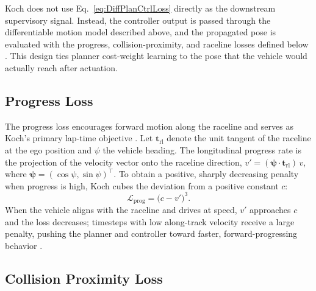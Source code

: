 Koch does not use Eq.~\eqref{eq:DiffPlanCtrlLoss} directly as the downstream supervisory signal.
Instead, the controller output is passed through the differentiable motion model described above, and the propagated pose is evaluated with the progress, collision-proximity, and raceline losses defined below \cite{koch_DifferentiableInterpretablePath_2025}.
This design ties planner cost-weight learning to the pose that the vehicle would actually reach after actuation.

\subsection{Progress Loss}

The progress loss encourages forward motion along the raceline and serves as Koch's primary lap-time objective \cite{koch_DifferentiableInterpretablePath_2025}.
Let $\mathbf{t}_{\text{rl}}$ denote the unit tangent of the raceline at the ego position and $\psi$ the vehicle heading.
The longitudinal progress rate is the projection of the velocity vector onto the raceline direction, $v' = (\boldsymbol{\psi} \cdot \mathbf{t}_{\text{rl}})\, v$, where $\boldsymbol{\psi} = (\cos\psi, \sin\psi)^{\top}$.
To obtain a positive, sharply decreasing penalty when progress is high, Koch cubes the deviation from a positive constant $c$:
\begin{equation}
    \mathcal{L}_{\text{prog}} = \bigl(c - v'\bigr)^{3}.
    \label{eq:DiffPlanProgLoss}
\end{equation}
When the vehicle aligns with the raceline and drives at speed, $v'$ approaches $c$ and the loss decreases; timesteps with low along-track velocity receive a large penalty, pushing the planner and controller toward faster, forward-progressing behavior \cite{koch_DifferentiableInterpretablePath_2025}.

\subsection{Collision Proximity Loss}

